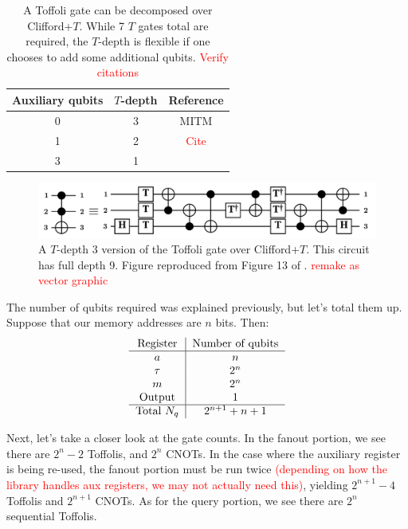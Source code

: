 \documentclass[a4paper,12pt]{article}
\newcommand\todo[1]{\textcolor{red}{#1}}
\begin{document}
\begin{table}
 \centering
  \captionsetup{width=.89\linewidth}
 \begin{tabular}{|c|c|c|}
  \hline
  Auxiliary qubits & $T$-depth & Reference \\ \hline
  0 & 3 & MITM \\ \hline
  1 & 2 & \todo{Cite} \\ \hline
  3 & 1 & \cite{Selinger2013} \\ \hline
 \end{tabular}
 \caption{A Toffoli gate can be decomposed over Clifford+$T$. 
 While 7 $T$ gates total are required, the $T$-depth is flexible if one chooses to add some additional qubits. \todo{Verify citations} }
 \label{tab:toffoli-tdepth}
\end{table}

\begin{figure}[h]
 \centering
 \captionsetup{width=.89\linewidth}
 \includegraphics[scale=0.4]{images/matt-toffoli-decomp}
 \caption{A $T$-depth 3 version of the Toffoli gate over Clifford+$T$. 
 This circuit has full depth 9. 
 Figure reproduced from Figure 13 of \cite{MITM}. \todo{remake as vector graphic}}
 \label{fig:toffoli-tdepth-3}
\end{figure}


The number of qubits required was explained previously, but let's total them up. 
Suppose that our memory addresses are $n$ bits. 
Then:
\begin{equation}
 \begin{tabular}{c|c}
  Register & Number  of qubits \\ \hline
  $a$ & $n$ \\
  $\tau$ & $2^n$ \\
  $m$ & $2^n$ \\
  Output & 1 \\ \hline
  Total $N_q$ & $2^{n+1} + n + 1$
 \end{tabular}
\end{equation} 

Next, let's take a closer look at the gate counts. 
In the fanout portion, we see there are $2^n - 2$ Toffolis, and $2^n$ CNOTs. 
In the case where the auxiliary register is being re-used, the fanout portion must be run twice \todo{(depending on how the library handles aux registers, we may not actually need this)}, yielding $2^{n+1} - 4$ Toffolis and $2^{n+1}$ CNOTs. 
As for the query portion, we see there are $2^n$ sequential Toffolis.
\end{document}
